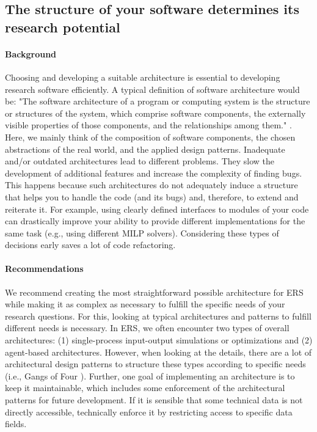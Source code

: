 \subsection{The structure of your software determines its research potential}\label{sec:architecture}

\paragraph{Background} Choosing and developing a suitable architecture is essential to developing research software efficiently. A typical definition of software architecture would be: "The software architecture of a program or computing system is the structure or structures of the system, which comprise software components, the externally visible properties of those components, and the relationships among them." \cite{BASSSoftwareArch}. Here, we mainly think of the composition of software components, the chosen abstractions of the real world, and the applied design patterns. Inadequate and/or outdated architectures lead to different problems. They slow the development of additional features and increase the complexity of finding bugs. This happens because such architectures do not adequately induce a structure that helps you to handle the code (and its bugs) and, therefore, to extend and reiterate it. For example, using clearly defined interfaces to modules of your code can drastically improve your ability to provide different implementations for the same task (e.g., using different MILP solvers). Considering these types of decisions early saves a lot of code refactoring.

\paragraph{Recommendations} We recommend creating the most straightforward possible architecture for \ac{ERS} while making it as complex as necessary to fulfill the specific needs of your research questions. For this, looking at typical architectures and patterns to fulfill different needs is necessary. In \ac{ERS}, we often encounter two types of overall architectures: (1) single-process input-output simulations or optimizations and (2) agent-based architectures. However, when looking at the details, there are a lot of architectural design patterns to structure these types according to specific needs (i.e., Gangs of Four \cite{GoFArch}). Further, one goal of implementing an architecture is to keep it maintainable, which includes some enforcement of the architectural patterns for future development. If it is sensible that some technical data is not directly accessible, technically enforce it by restricting access to specific data fields.

